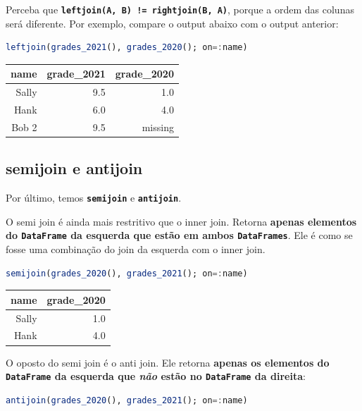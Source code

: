 \documentclass[
  notoc %
]{tufte-book}
\newcommand{\passthrough}[1]{#1}
\begin{document}
Perceba que
\textbf{\passthrough{\lstinline"leftjoin(A, B) != rightjoin(B, A)"}},
porque a ordem das colunas será diferente. Por exemplo, compare o output
abaixo com o output anterior:

\begin{lstlisting}[language=Julia]
leftjoin(grades_2021(), grades_2020(); on=:name)
\end{lstlisting}

\begin{longtable}[]{@{}rrr@{}}
\toprule
name & grade\_2021 & grade\_2020 \\
\midrule
\endhead
Sally & 9.5 & 1.0 \\
Hank & 6.0 & 4.0 \\
Bob 2 & 9.5 & missing \\
\bottomrule
\end{longtable}

\hypertarget{sec:semijoin_antijoin}{%
\subsection{semijoin e antijoin}\label{sec:semijoin_antijoin}}

Por último, temos \textbf{\passthrough{\lstinline!semijoin!}} e
\textbf{\passthrough{\lstinline!antijoin!}}.

O semi join é ainda mais restritivo que o inner join. Retorna
\textbf{apenas elementos do \passthrough{\lstinline!DataFrame!} da
esquerda que estão em ambos \passthrough{\lstinline!DataFrames!}}. Ele é
como se fosse uma combinação do join da esquerda com o inner join.

\begin{lstlisting}[language=Julia]
semijoin(grades_2020(), grades_2021(); on=:name)
\end{lstlisting}

\begin{longtable}[]{@{}rr@{}}
\toprule
name & grade\_2020 \\
\midrule
\endhead
Sally & 1.0 \\
Hank & 4.0 \\
\bottomrule
\end{longtable}

O oposto do semi join é o anti join. Ele retorna \textbf{apenas os
elementos do \passthrough{\lstinline!DataFrame!} da esquerda que
\emph{não} estão no \passthrough{\lstinline!DataFrame!} da direita}:

\begin{lstlisting}[language=Julia]
antijoin(grades_2020(), grades_2021(); on=:name)
\end{lstlisting}
\end{document}
